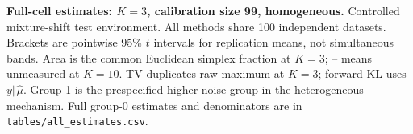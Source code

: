\textbf{Full-cell estimates: $K=3$, calibration size 99, homogeneous.} Controlled mixture-shift test environment. All methods share 100 independent datasets. Brackets are pointwise 95\% $t$ intervals for replication means, not simultaneous bands. Area is the common Euclidean simplex fraction at $K=3$; -- means unmeasured at $K=10$. TV duplicates raw maximum at $K=3$; forward KL uses $y\Vert\hat\mu$. Group 1 is the prespecified higher-noise group in the heterogeneous mechanism. Full group-0 estimates and denominators are in \texttt{tables/all\_estimates.csv}.
